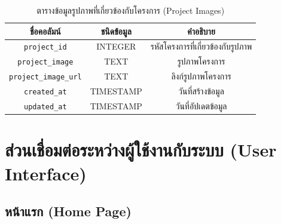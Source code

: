 \begin{table}[hb]
    \centering
    \begin{tabular}{|c|c|c|}
        \hline
        ชื่อคอลัมน์                   & ชนิดข้อมูล   & คำอธิบาย                    \\ \hline
        \verb |project_id|        & INTEGER   & รหัสโครงการที่เกี่ยวข้องกับรูปภาพ \\ \hline
        \verb |project_image|     & TEXT      & รูปภาพโครงการ              \\ \hline
        \verb |project_image_url| & TEXT      & ลิงก์รูปภาพโครงการ           \\ \hline
        \verb |created_at|        & TIMESTAMP & วันที่สร้างข้อมูล               \\ \hline
        \verb |updated_at|        & TIMESTAMP & วันที่อัปเดตข้อมูล              \\ \hline
    \end{tabular}
    \caption{ตารางข้อมูลรูปภาพที่เกี่ยวข้องกับโครงการ (Project Images)}
    \label{tab:project_images_data}
\end{table}

\clearpage %
\section{ส่วนเชื่อมต่อระหว่างผู้ใช้งานกับระบบ (User Interface)}
\subsection{หน้าแรก (Home Page)}
